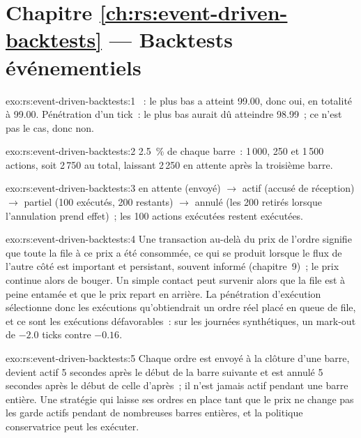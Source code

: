 \section*{Chapitre \ref{ch:rs:event-driven-backtests} --- Backtests événementiels}

\begin{solution}{exo:rs:event-driven-backtests:1}
~: le plus bas a atteint 99.00, donc oui, en totalité à 99.00. Pénétration d'un tick~: le plus bas aurait dû atteindre 98.99~; ce n'est pas le cas, donc non.
\end{solution}

\begin{solution}{exo:rs:event-driven-backtests:2}
2.5~\% de chaque barre~: 1\,000, 250 et 1\,500 actions, soit 2\,750 au total, laissant 2\,250 en attente après la troisième barre.
\end{solution}

\begin{solution}{exo:rs:event-driven-backtests:3}
en attente (envoyé) $\to$ actif (accusé de réception) $\to$ partiel (100 exécutés, 200 restants) $\to$ annulé (les 200 retirés lorsque l'annulation prend effet)~;
les 100 actions exécutées restent exécutées.
\end{solution}

\begin{solution}{exo:rs:event-driven-backtests:4}
Une transaction au-delà du prix de l'ordre signifie que toute la file à ce prix a été consommée, ce qui se produit lorsque le flux de l'autre côté est important et
persistant, souvent informé (chapitre~9)~; le prix continue alors de bouger. Un simple contact peut survenir alors que la file est à peine entamée et que le prix repart en arrière. La
pénétration d'exécution sélectionne donc les exécutions qu'obtiendrait un ordre réel placé en queue de file, et ce sont les exécutions défavorables~: sur les journées synthétiques,
un mark-out de $-2.0$ ticks contre $-0.16$.
\end{solution}

\begin{solution}{exo:rs:event-driven-backtests:5}
Chaque ordre est envoyé à la clôture d'une barre, devient actif 5 secondes après le début de la barre suivante et est annulé 5 secondes après le début de celle d'après~; il n'est jamais actif
pendant une barre entière. Une stratégie qui laisse ses ordres en place tant que le prix ne change pas les garde actifs pendant de nombreuses barres entières, et la politique conservatrice peut les exécuter.
\end{solution}

